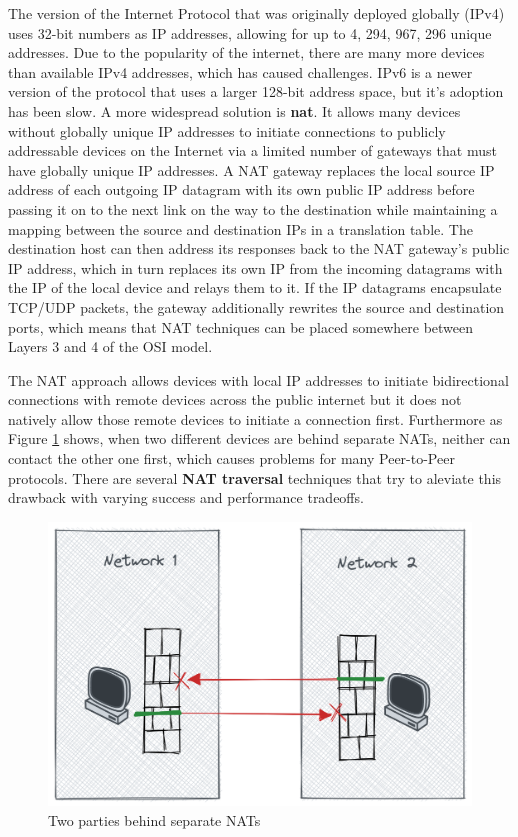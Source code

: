The version of the Internet Protocol that was originally deployed
globally (IPv4) uses 32-bit numbers as IP addresses, allowing for up to
4, 294, 967, 296 unique addresses. Due to the popularity of the
internet, there are many more devices than available IPv4 addresses,
which has caused challenges. IPv6 is a newer version of the protocol
that uses a larger 128-bit address space, but it's adoption has been
slow. A more widespread solution is \textbf{\gls{nat}}. It allows many
devices without globally unique IP addresses to initiate connections to
publicly addressable devices on the Internet via a limited number of
gateways that must have globally unique IP addresses. A NAT gateway
replaces the local source IP address of each outgoing IP datagram with
its own public IP address before passing it on to the next link on the
way to the destination while maintaining a mapping between the source
and destination IPs in a translation table. The destination host can
then address its responses back to the NAT gateway's public IP address,
which in turn replaces its own IP from the incoming datagrams with the
IP of the local device and relays them to it. If the IP datagrams
encapsulate TCP/UDP packets, the gateway additionally rewrites the
source and destination ports, which means that NAT techniques can be
placed somewhere between Layers 3 and 4 of the OSI model.

The NAT approach allows devices with local IP addresses to initiate
bidirectional connections with remote devices across the public internet
but it does not natively allow those remote devices to initiate a
connection first. Furthermore as Figure \ref{nat-intro} shows, when two
different devices are behind separate NATs, neither can contact the
other one first, which causes problems for many Peer-to-Peer protocols.
There are several \textbf{NAT traversal} techniques that try to aleviate
this drawback with varying success and performance tradeoffs.

\begin{figure}
\centering
\includegraphics[width=\textwidth,height=0.25\textheight]{thesis/../figures/nat-intro.png}
\caption{Two parties behind separate NATs\label{nat-intro}}
\end{figure}

